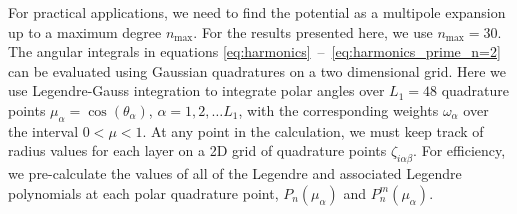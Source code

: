 For practical applications, we need to find the potential as a multipole expansion up
to a maximum degree $n_{\max}$. For the results presented here, we use $n_{\max}=30$.
The angular integrals in equations
\eqref{eq:harmonics}~--~\eqref{eq:harmonics_prime_n=2} can be evaluated using
Gaussian quadratures on a two dimensional grid. Here we use Legendre-Gauss
integration to integrate polar angles over $L_{1}=48$ quadrature points
$\mu_{\alpha}=\cos(\theta_{\alpha})$, $\alpha = 1,2,\dots L_{1}$, with the
corresponding weights $\omega_{\alpha}$ over the interval
$0<\mu<1$. At any point in the calculation, we must keep track of radius values for
each layer on a 2D grid of quadrature points $\zeta_{i\alpha\beta}$. For efficiency,
we pre-calculate the values of all of the Legendre and associated Legendre polynomials
at each polar quadrature point, $P_n(\mu_\alpha)$ and $P_n^m(\mu_\alpha)$.

